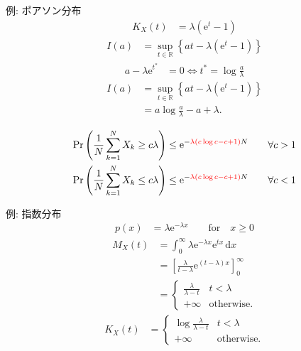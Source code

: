 \documentclass[lualatex,handout]{beamer}
\newcommand{\emm}[1]{\textcolor{red}{#1}}
\newcommand\dx{{\,\mathrm{d}x}}
\theoremstyle{definition}
\begin{document}
\begin{frame}{例: ポアソン分布}
\begin{align*}
K_X(t) &= \lambda(\mathrm{e}^t-1)
\end{align*}
\begin{align*}
I(a)&=\sup_{t\in\mathbb{R}}\left\{at - \lambda(\mathrm{e}^t-1)\right\}
\end{align*}
\begin{align*}
a-\lambda\mathrm{e}^{t^*} &= 0\iff t^* = \log \frac{a}{\lambda}
\end{align*}
\begin{align*}
I(a)&=\sup_{t\in\mathbb{R}}\left\{at - \lambda(\mathrm{e}^t-1)\right\}\\
 &= a\log\frac{a}{\lambda} -a + \lambda.
\end{align*}

\vspace{.5em}
\begin{align*}
\Pr\left(\frac1N\sum_{k=1}^N X_k \ge c\lambda\right) &\le \mathrm{e}^{-\emm{\lambda\left(c\log c -c + 1 \right)}N}\qquad\forall c > 1\\
\Pr\left(\frac1N\sum_{k=1}^N X_k \le c\lambda\right) &\le \mathrm{e}^{-\emm{\lambda\left(c\log c -c + 1 \right)}N}\qquad\forall c < 1\\
\end{align*}
\end{frame}

\begin{frame}{例: 指数分布}
\begin{align*}
p(x) &= \lambda\mathrm{e}^{-\lambda x}\qquad\text{for}\quad x\ge 0
\end{align*}
\begin{align*}
M_X(t) &= \int_{0}^\infty \lambda\mathrm{e}^{-\lambda x} \mathrm{e}^{tx}\dx\\
&=\left[\frac{\lambda}{t-\lambda}\mathrm{e}^{(t-\lambda)x}\right]_0^{\infty}\\
&=\begin{cases}
\frac{\lambda}{\lambda-t}& t < \lambda\\
+\infty&\text{otherwise.}
\end{cases}
\end{align*}
\begin{align*}
K_X(t) &=
\begin{cases}
\log\frac{\lambda}{\lambda-t}& t < \lambda\\
+\infty&\text{otherwise.}
\end{cases}
\end{align*}
\end{frame}
\end{document}
